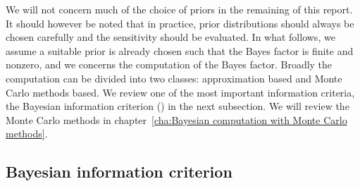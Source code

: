 We will not concern much of the choice of priors in the remaining of this
report. It should however be noted that in practice, prior distributions
should always be chosen carefully and the sensitivity should be evaluated. In
what follows, we assume a suitable prior is already chosen such that the Bayes
factor is finite and nonzero, and we concerns the computation of the Bayes
factor. Broadly the computation can be divided into two classes: approximation
based and Monte Carlo methods based. We review one of the most important
information criteria, the Bayesian information criterion (\bic) in the next
subsection. We will review the Monte Carlo methods in
chapter~\ref{cha:Bayesian computation with Monte Carlo methods}.

\firstyear
\subsection{Bayesian information criterion}
\label{sub:Bayesian information criterion}

